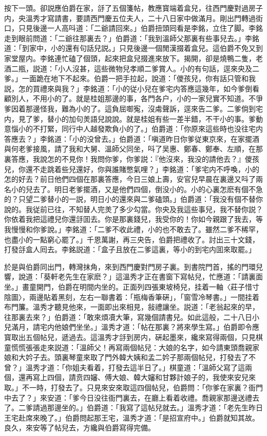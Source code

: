按下一頭。卻説應伯爵在家，㧱了五個箋帖，教應寳端着盒兒，往西門慶對過房子内，央溫秀才寫請書，要請西門慶五位夫人，二十八日家中做滿月。剛出門轉過街口，只見後邊一人高呌道：「二爺請回來。」伯爵扭頭囘看是李銘，立住了脚。李銘走到眼前問道：「二爺往那裏去？」伯爵道：「我到溫師父那裏有些事兒去。」李銘道：「到家中，小的還有句話兒説。」只見後邊一個閒漢掇着盒兒。這伯爵不免又到家堂屋内。李銘連忙磕了個頭，起來把盒兒掇進來放下。揭開，卻是燒鴨二隻，老酒二瓶，説道：「小人沒甚，這些微物兒孝順二爹賞人。小的有句話，逕來央及二爹。」一面跪在地下不起來。伯爵一把手拉起，說道：「儍孩兒，你有話只管和我説，怎的買禮來與我？」李銘道：「小的従小兒在爹宅内答應這幾年，如今爹倒看顧別人，不用小的了。就是桂姐那邊的事，各門各户，小的一家兒實不知道。不爭爹因着那邊怪我，難為小的了。這負屈啣寃，沒䖏聲訴，逕來告二爹。二爹倘到宅内，見了爹，替小的加句羙語兒說說。就是桂姐有些一差半錯，不干小的事。爹動意惱小的不打緊，同行中人越發欺負小的了。」伯爵道：「你原來這些時也没往宅内答應去？」李銘道：「小的没曾去。」伯爵道：「嗔道昨日你爹従東京來，在家擺酒與何老爹接風，請了我和大舅、溫師父同坐，呌了吴惠、鄭春、鄭奉、左順，在那裏答應，我說怎的不見你！我問你爹，你爹説：『他沒來，我没的請他去？』儍孩兒，你還不走跳着些兒還好，你與誰賭憋氣哩？」李銘道：「爹宅内不呼喚，小的怎的好去？前日他們四個在那裏答應，今日三娘上壽，安官兒早晨在裏邊又呌了兩名小的兒去了。明日老爹擺酒，又是他們四個，倒没小的。小的心裏怎麽有個不急的？只望二爹替小的一説，明日小的還來與二爹磕頭。」伯爵道：「我没有個不替你說的。我従前已往，不知替人完羙了多少勾當。你央及我這些事兒，我不替你説？你依着我把這禮兒你還㧱囬去。你是那裏錢兒，我受你的！你如今親跟了我去，等我慢慢和你爹說。」李銘道：「二爹不收此禮，小的也不敢去了。雖然二爹不稀罕，也盡小的一點窮心罷了。」千恩萬謝，再三央告，伯爵把禮收了。討出三十文錢，打發㧱盒人囘去。李銘説道：「盒子且放在二爹這裏，等小的到宅内囬來取罷。」

於是與伯爵同出門，轉灣抹角，來到西門慶對門房子裏。到書院門首，搖的門環兒響，說道：「葵軒老先生在家麽？」這溫秀才正在書窗下寫帖兒，忙應道：「請裏面坐。」畫童開門，伯爵在明間内坐的。正面列四張東坡椅兒，挂着一軸〈莊子惜寸陰圖〉，兩邊貼着黑刻，左右一聯書着：「瓶梅香筆硏」，「窗雪冷琴書。」一間挂着布門簾。溫秀才聽見他來，一面即出來相見，敍禮讓坐。説道：「老翁起來的早，往那裏去來？」伯爵道：「敢來煩凟大筆，寫幾個請書兒。如此這般，二十八日小兒滿月，請宅内他娘們坐坐。」溫秀才道：「帖在那裏？將來學生寫。」伯爵即令應寳取出五個帖兒，遞過去。這溫秀才㧱到房内，硏起墨來，纔來寫得兩個，只見棋童慌慌張張走來説道：「溫師父！再寫兩個帖兒：大娘的名字，如今請東頭喬親家娘和大妗子去。頭裏琴童來取了門外韓大姨和孟二妗子那兩個帖兒，打發去了不曾？」溫秀才道：「你姐夫看着，打發去這半日了。」棋童道：「溫師父寫了這兩個，還再寫上四個，請贲四嬸、傅大娘、韓大嬸和甘夥計娘子的，我使來安兒來取。」不一時，打發去了。只見來安來取這四個帖兒，伯爵問：「你爹在家裏？衙門中去了？」來安道：「爹今日没往衙門裏去，在廳上看着收禮。喬親家那邊送禮去了。二爹請過那邊坐的。」伯爵道：「我寫了這帖兒就去。」溫秀才道：「老先生昨日王宅赴席來晚了。」伯爵問起那王宅，溫秀才道：「是招宣府中。」伯爵就知其故。良久，來安等了帖兒去，方纔與伯爵寫得完備。

